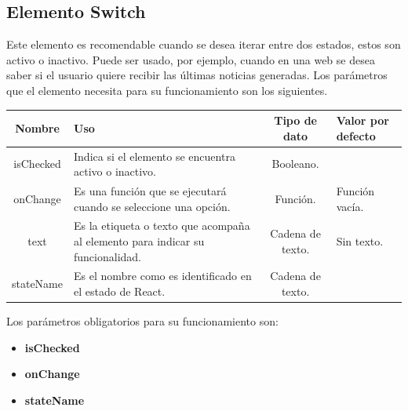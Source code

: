 \subsection{Elemento Switch}
Este elemento es recomendable cuando se desea iterar entre dos estados, estos son activo o inactivo. Puede ser usado, por ejemplo, cuando en una web se desea saber si el usuario quiere recibir las últimas noticias generadas.
Los parámetros que el elemento necesita para su funcionamiento son los siguientes.
\newline
    \newline
    \begin{center}
     \begin{tabular}{ | c |  p{5cm}  | c | p{3cm} |} 
     \hline
     \textbf{Nombre} &  \textbf{Uso} &  \textbf{ Tipo de dato} &  \textbf{Valor por defecto}\\ [0.5ex] 
     \hline\hline
     isChecked &  Indica si el elemento se encuentra activo o inactivo. &   Booleano. & \\  [2.5ex] 
     \hline
     onChange &  Es una función que se ejecutará cuando se seleccione una opción. &   Función. & Función vacía. \\  [2.5ex] 
     \hline
     text &  Es la etiqueta o texto que acompaña al elemento para indicar su funcionalidad. &   Cadena de texto. & Sin texto. \\  [2.5ex] 
     \hline
     stateName &  Es el nombre como es identificado en el estado de React. &  Cadena de texto. & \\  [2.5ex] 
     \hline
    \end{tabular}
    \end{center}
    \newline
        \newline
Los parámetros obligatorios para su funcionamiento son:
\begin{itemize}
\item \textbf{isChecked} 
\item \textbf{onChange} 
\item \textbf{stateName} 
\end{itemize}
\newline
    \newline
